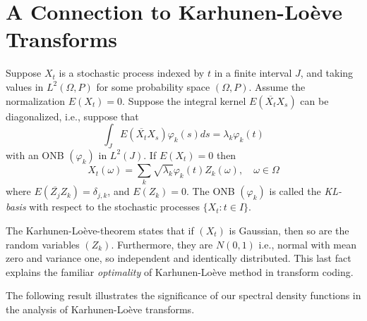 \documentclass{birkmult}
\theoremstyle{definition}
\theoremstyle{remark}
\numberwithin{equation}{section}
\begin{document}
\section{A Connection to Karhunen-Lo\`{e}ve Transforms}
\label{sec:6}
Suppose $X_{t}$ is a stochastic process indexed by $t$ in a finite interval 
$J$, and taking values in $L^{2}(\Omega, P)$ for some probability space 
$(\Omega, P)$. Assume the normalization $E(X_{t})=0$. Suppose the integral 
kernel $E(\overline{X_{t}} X_{s})$ can be 
diagonalized, i.e., suppose that 
\[
  \int_{J}{E(\overline{X_{t}} X_{s})\varphi_{k}(s)}ds=\lambda_{k}\varphi_{k}(t)
\]
with an ONB $(\varphi_{k})$ in $L^{2}(J)$.  If $E(X_{t})=0$ then
\[
  X_{t}(\omega)=\sum_{k}\sqrt{\lambda_{k}}\varphi_{k}(t)Z_{k}(\omega), 
  \quad \omega \in \Omega
\]
where $E(\overline{Z_{j}} Z_{k})=\delta_{j,k}$, and $E(Z_{k})=0$.
The ONB $(\varphi_{k})$ is called the \textit{KL-basis} with respect to the 
stochastic processes $\{X_{t}: t \in I \}$.

The Karhunen-Lo\`{e}ve-theorem \cite{Ash90} states that if $(X_{t})$ is 
Gaussian, then so are the random variables $(Z_{k})$.  Furthermore, they 
are $N(0,1)$ i.e., normal with mean zero and variance one, so independent 
and identically distributed. This last fact explains the familiar 
\textit{optimality} of Karhunen-Lo\`{e}ve method in transform coding.

The following result illustrates the significance of our spectral density 
functions in the analysis of Karhunen-Lo\`{e}ve transforms.
\end{document}
